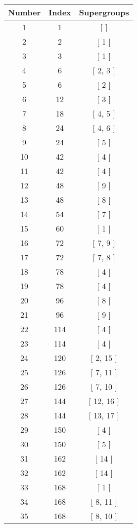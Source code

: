 \begin{center}
\begin{longtable}[H]{|| c c c ||}
\hline
Number & Index & Supergroups \\ 
\hline
1 & 1 & [ ] \\ 
\hline
2 & 2 & [ 1 ] \\ 
\hline
3 & 3 & [ 1 ] \\ 
\hline
4 & 6 & [ 2, 3 ] \\ 
\hline
5 & 6 & [ 2 ] \\ 
\hline
6 & 12 & [ 3 ] \\ 
\hline
7 & 18 & [ 4, 5 ] \\ 
\hline
8 & 24 & [ 4, 6 ] \\ 
\hline
9 & 24 & [ 5 ] \\ 
\hline
10 & 42 & [ 4 ] \\ 
\hline
11 & 42 & [ 4 ] \\ 
\hline
12 & 48 & [ 9 ] \\ 
\hline
13 & 48 & [ 8 ] \\ 
\hline
14 & 54 & [ 7 ] \\ 
\hline
15 & 60 & [ 1 ] \\ 
\hline
16 & 72 & [ 7, 9 ] \\ 
\hline
17 & 72 & [ 7, 8 ] \\ 
\hline
18 & 78 & [ 4 ] \\ 
\hline
19 & 78 & [ 4 ] \\ 
\hline
20 & 96 & [ 8 ] \\ 
\hline
21 & 96 & [ 9 ] \\ 
\hline
22 & 114 & [ 4 ] \\ 
\hline
23 & 114 & [ 4 ] \\ 
\hline
24 & 120 & [ 2, 15 ] \\ 
\hline
25 & 126 & [ 7, 11 ] \\ 
\hline
26 & 126 & [ 7, 10 ] \\ 
\hline
27 & 144 & [ 12, 16 ] \\ 
\hline
28 & 144 & [ 13, 17 ] \\ 
\hline
29 & 150 & [ 4 ] \\ 
\hline
30 & 150 & [ 5 ] \\ 
\hline
31 & 162 & [ 14 ] \\ 
\hline
32 & 162 & [ 14 ] \\ 
\hline
33 & 168 & [ 1 ] \\ 
\hline
34 & 168 & [ 8, 11 ] \\ 
\hline
35 & 168 & [ 8, 10 ] \\ 
\hline

\end{longtable}
\end{center}
